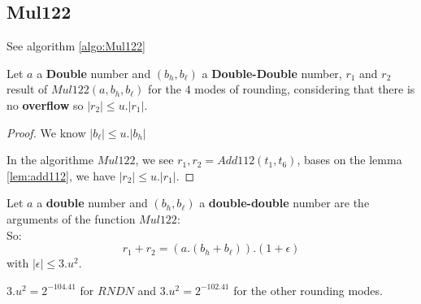 \subsection{Mul122}
See algorithm \ref{algo:Mul122}
\begin{lem}[Mul122] Let $a$ a \textbf{Double} number and $(b_h,b_{\ell})$ a \textbf{Double-Double} number, $r_1$ and $r_2$ result of $Mul122(a,b_h,b_{\ell})$ for the $4$ modes of rounding, considering that there is no \textbf{overflow} so $\lvert r_2 \rvert \le u. \lvert r_1 \rvert$.
\end{lem}

\begin{proof} \color{-yellow}
We know $\lvert b_{\ell} \rvert \le u.\lvert b_h \rvert$

 In the algorithme $Mul122$, we see $r_1, r_2 = Add112(t_1, t_6)$, bases on the lemma \ref{lem:add112}, we have $\lvert r_2 \rvert \le u.\lvert r_1 \rvert$.
\end{proof}

\begin{theo}

Let $a$ a \textbf{double} number and $(b_h,b_{\ell})$ a \textbf{double-double} number are the arguments of the function $Mul122$:\\
So:
$$r_1+r_2 = (a. (b_h+b_{\ell})).(1+\epsilon)$$ with $\lvert \epsilon \rvert \le 3.u^2$.
\end{theo}

$3.u^2 = 2^{-104.41}$ for $RNDN$ and $3.u^2 = 2^{-102.41}$ for the other rounding modes.

